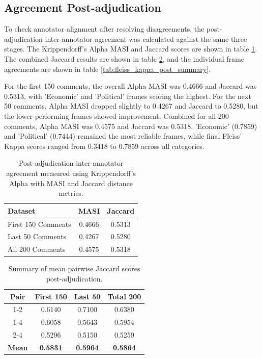 \documentclass[
10pt, %
a4paper, %
oneside, %
headinclude,footinclude, %
] {book}%
\begin{document}
\subsection{Agreement Post-adjudication}
To check annotator alignment after resolving disagreements, the post-adjudication inter-annotator agreement was calculated against the same three stages. The Krippendorff's Alpha MASI and Jaccard scores are shown in table \ref{tab:post_masi_jaccard}. The combined Jaccard results are shown in table \ref{tab:pair_jaccard_post_summary}, and the individual frame agreements are shown in table \ref{tab:fleiss_kappa_post_summary}.

For the first 150 comments, the overall Alpha MASI was 0.4666 and Jaccard was 0.5313, with 'Economic' and 'Political' frames scoring the highest. For the next 50 comments, Alpha MASI dropped slightly to 0.4267 and Jaccard to 0.5280, but the lower-performing frames showed improvement. Combined for all 200 comments, Alpha MASI was 0.4575 and Jaccard was 0.5318. 'Economic' (0.7859) and 'Political' (0.7444) remained the most reliable frames, while final Fleiss' Kappa scores ranged from 0.3418 to 0.7859 across all categories.




\begin{table}[htbp]
\centering
\begin{tabular}{lcc}
\toprule
\textbf{Dataset} & \textbf{MASI} & \textbf{Jaccard} \\
\midrule
First 150 Comments & 0.4666 & 0.5313 \\
Last 50 Comments & 0.4267 & 0.5280 \\
All 200 Comments & 0.4575 & 0.5318 \\
\bottomrule
\end{tabular}
\caption{Post-adjudication inter-annotator agreement measured using Krippendorff's Alpha with MASI and Jaccard distance metrics.}
\label{tab:post_masi_jaccard}
\end{table}

\begin{table}[htbp]
    \centering
    \begin{tabular}{cccc}
        \textbf{Pair} & \textbf{First 150} & \textbf{Last 50} & \textbf{Total 200} \\
        \hline
        1-2 & 0.6140 & 0.7100 & 0.6380 \\
        1-4 & 0.6058 & 0.5643 & 0.5954 \\
        2-4 & 0.5296 & 0.5150 & 0.5259 \\
        \hline
        \textbf{Mean} & \textbf{0.5831} & \textbf{0.5964} & \textbf{0.5864} \\
    \end{tabular}
    \caption{Summary of mean pairwise Jaccard scores post-adjudication.}
    \label{tab:pair_jaccard_post_summary}
\end{table}
\end{document}
